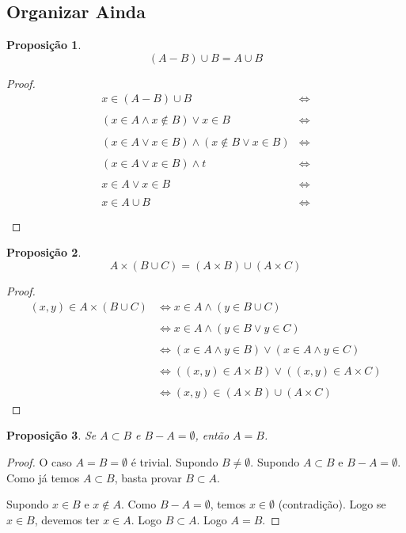 \documentclass{article}
\theoremstyle{plain}
\newtheorem{prop}{Proposição}[section]
\theoremstyle{definition}
\theoremstyle{remark}
\begin{document}
\subsection{Organizar Ainda}
\begin{prop}
	$$(A-B)\cup B =  A\cup B$$
\end{prop}
\begin{proof}
	\begin{align*}
		x\in (A-B)\cup B &\iff \\~\\
		(x\in A \land x \not \in B) \lor x\in B &\iff \\~\\
		(x\in A\lor x\in B)  \land( x \not \in B \lor x\in B) &\iff \\~\\
		(x\in A\lor x\in B)  \land t &\iff \\~\\
		x\in A\lor x\in B &\iff \\~\\
		x \in A \cup B  &\iff \\~\\
	\end{align*}
\end{proof}
\begin{prop}
	$$A\times (B\cup C ) = (A\times B )\cup( A\times C)$$
\end{prop}
\begin{proof}
	\begin{align*}
		(x,y) \in A\times (B\cup C ) & \iff 
		x\in A \land (y\in B\cup C)  \\~\\ &\iff 
		x\in A \land (y\in B\lor y\in  C)  \\~\\& \iff
		(x\in A \land y\in B) \lor (x\in A \land y\in  C)  \\~\\& \iff
		((x,y)\in A\times B) \lor  ((x,y)\in  A\times C) \\~\\ & \iff
		(x,y)\in (A\times B) \cup  (A\times C)
	\end{align*}
\end{proof}
\begin{prop}
	Se $A\subset B$ e $B-A = \emptyset$, então $A = B$.
\end{prop}
\begin{proof}
	O caso $A = B  = \emptyset $ é trivial. Supondo $B \neq \emptyset$.
	Supondo $A\subset B$ e $B-A = \emptyset$. Como já temos $A\subset B$, basta provar $B \subset A$. 

	Supondo $x\in B$ e $x\not \in A$. Como $B-A = \emptyset$, temos $x\in \emptyset$ (contradição). Logo se $x\in B$, devemos ter $x\in A$. Logo $B \subset A$. Logo $A = B$.
\end{proof}
\end{document}

